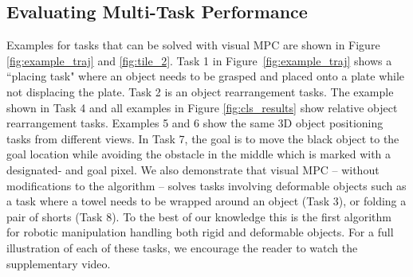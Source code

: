 \subsection{Evaluating Multi-Task Performance}
\label{subsec:multi_task_bench}
Examples for tasks that can be solved with visual MPC are shown in Figure \ref{fig:example_traj} and \ref{fig:tile_2}. Task 1 in Figure~\ref{fig:example_traj} shows a ``placing task" where an object needs to be grasped and placed onto a plate while not displacing the plate. Task 2 is an object rearrangement tasks. The example shown in Task 4 and all examples in Figure \ref{fig:cls_results} show relative object rearrangement tasks. Examples 5 and 6 show the same 3D object positioning tasks from different views. In Task 7, the goal is to move the black object to the goal location while avoiding the obstacle in the middle which is marked with a designated- and goal pixel. We also demonstrate that visual MPC -- without modifications to the algorithm -- solves tasks involving deformable objects such as a task where a towel needs to be wrapped around an object (Task 3), or folding a pair of shorts (Task 8). To the best of our knowledge this is the first algorithm for robotic manipulation handling both rigid and deformable objects.
For a full illustration of each of these tasks, we encourage the reader to watch the supplementary video.


